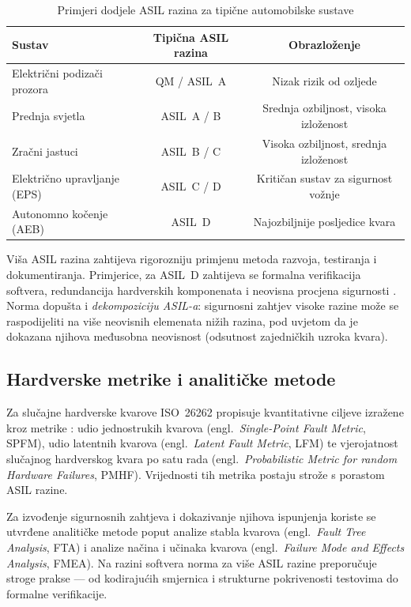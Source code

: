 \begin{table}[H]
\centering
\caption{Primjeri dodjele ASIL razina za tipične automobilske sustave}
\label{tab:asil}
\begin{tabular}{lcc}
\toprule
\textbf{Sustav} & \textbf{Tipična ASIL razina} & \textbf{Obrazloženje} \\
\midrule
Električni podizači prozora & QM / ASIL~A & Nizak rizik od ozljede \\
Prednja svjetla & ASIL~A / B & Srednja ozbiljnost, visoka izloženost \\
Zračni jastuci & ASIL~B / C & Visoka ozbiljnost, srednja izloženost \\
Električno upravljanje (EPS) & ASIL~C / D & Kritičan sustav za sigurnost vožnje \\
Autonomno kočenje (AEB) & ASIL~D & Najozbiljnije posljedice kvara \\
\bottomrule
\end{tabular}
\end{table}

Viša ASIL razina zahtijeva rigorozniju primjenu metoda razvoja, testiranja i dokumentiranja. Primjerice, za ASIL~D zahtijeva se formalna verifikacija softvera, redundancija hardverskih komponenata i neovisna procjena sigurnosti \cite{shinde2026reimagining}. Norma dopušta i \textit{dekompoziciju ASIL-a}: sigurnosni zahtjev visoke razine može se raspodijeliti na više neovisnih elemenata nižih razina, pod uvjetom da je dokazana njihova međusobna neovisnost (odsutnost zajedničkih uzroka kvara).

\subsection{Hardverske metrike i analitičke metode}

Za slučajne hardverske kvarove ISO~26262 propisuje kvantitativne ciljeve izražene kroz metrike \cite{iso26262}: udio jednostrukih kvarova (engl.\ \textit{Single-Point Fault Metric}, SPFM), udio latentnih kvarova (engl.\ \textit{Latent Fault Metric}, LFM) te vjerojatnost slučajnog hardverskog kvara po satu rada (engl.\ \textit{Probabilistic Metric for random Hardware Failures}, PMHF). Vrijednosti tih metrika postaju strože s porastom ASIL razine.

Za izvođenje sigurnosnih zahtjeva i dokazivanje njihova ispunjenja koriste se utvrđene analitičke metode poput analize stabla kvarova (engl.\ \textit{Fault Tree Analysis}, FTA) i analize načina i učinaka kvarova (engl.\ \textit{Failure Mode and Effects Analysis}, FMEA). Na razini softvera norma za više ASIL razine preporučuje stroge prakse — od kodirajućih smjernica i strukturne pokrivenosti testovima do formalne verifikacije.

